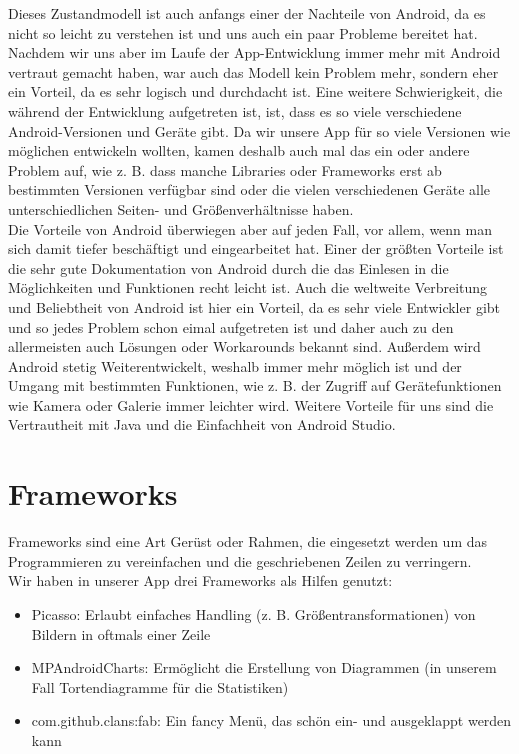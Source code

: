 Dieses Zustandmodell ist auch anfangs einer der Nachteile von Android, da es nicht so leicht zu verstehen ist und uns auch ein paar Probleme bereitet hat. Nachdem wir uns aber im Laufe der App-Entwicklung immer mehr mit Android vertraut gemacht haben, war auch das Modell kein Problem mehr, sondern eher ein Vorteil, da es sehr logisch und durchdacht ist. Eine weitere Schwierigkeit, die während der Entwicklung aufgetreten ist, ist, dass es so viele verschiedene Android-Versionen und Geräte gibt. Da wir unsere App für so viele Versionen wie möglichen entwickeln wollten, kamen deshalb auch mal das ein oder andere Problem auf, wie z. B. dass manche Libraries oder Frameworks erst ab bestimmten Versionen verfügbar sind oder die vielen verschiedenen Geräte alle unterschiedlichen Seiten- und Größenverhältnisse haben.\\
Die Vorteile von Android überwiegen aber auf jeden Fall, vor allem, wenn man sich damit tiefer beschäftigt und eingearbeitet hat. Einer der größten Vorteile ist die sehr gute Dokumentation von Android durch die das Einlesen in die Möglichkeiten und Funktionen recht leicht ist. Auch die weltweite Verbreitung und Beliebtheit von Android ist hier ein Vorteil, da es sehr viele Entwickler gibt und so jedes Problem schon eimal aufgetreten ist und daher auch zu den allermeisten auch Lösungen oder Workarounds bekannt sind.
Außerdem wird Android stetig Weiterentwickelt, weshalb immer mehr möglich ist und der Umgang mit bestimmten Funktionen, wie z. B. der Zugriff auf Gerätefunktionen wie Kamera oder Galerie immer leichter wird.
Weitere Vorteile für uns sind die Vertrautheit mit Java und die Einfachheit von Android Studio.

\section{Frameworks}
\label{sec:grundlagen:frameworks}
Frameworks sind eine Art Gerüst oder Rahmen, die eingesetzt werden um das Programmieren zu vereinfachen und die geschriebenen Zeilen zu verringern.\\
Wir haben in unserer App drei Frameworks als Hilfen genutzt:
\begin{itemize}
\item Picasso: Erlaubt einfaches Handling (z. B. Größentransformationen) von Bildern in oftmals einer Zeile
\item MPAndroidCharts: Ermöglicht die Erstellung von Diagrammen (in unserem Fall Tortendiagramme für die Statistiken)
\item com.github.clans:fab: Ein fancy Menü, das schön ein- und ausgeklappt werden kann
\end{itemize}



















